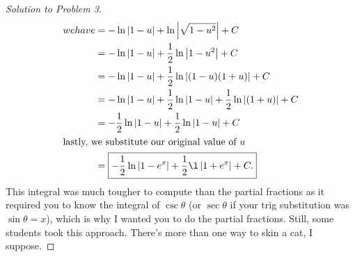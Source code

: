 \documentclass[12pt]{article}
\theoremstyle{plain}
\theoremstyle{definition}
\theoremstyle{remark}
\begin{document}
\begin{proof}[Solution to Problem 3]
\begin{align*}
{  we have }
&=-\ln\left|1-u\right|+\ln\left|\sqrt{1-u^2}\right|+C\\
&=-\ln\left|1-u\right|+\frac{1}{2}\ln\left|1-u^2\right|+C\\
&=-\ln\left|1-u\right|+\frac{1}{2}\ln\left|(1-u)(1+u)\right|+C\\
&=-\ln\left|1-u\right|+\frac{1}{2}\ln\left|1-u\right|
+\frac{1}{2}\ln\left|(1+u)\right|+C\\
&=-\frac{1}{2}\ln\left|1-u\right|+\frac{1}{2}\ln\left|1-u\right|+C\\
\intertext{lastly, we substitute our original value of $u$}
&=\boxed{-\frac{1}{2}\ln\left|1-e^x\right|+\frac{1}{2}\l\left|1+e^x\right|+C.}
\qedhere
\end{align*}
This integral was much tougher to compute than the partial fractions as it
required you to know the integral of $\csc\theta$ (or $\sec\theta$ if your
trig substitution was $\sin\theta=x$), which is why I wanted you to do the
partial fractions. Still, some students took this approach. There's more
than one way to skin a cat, I suppose.
\end{proof}
\end{document}
